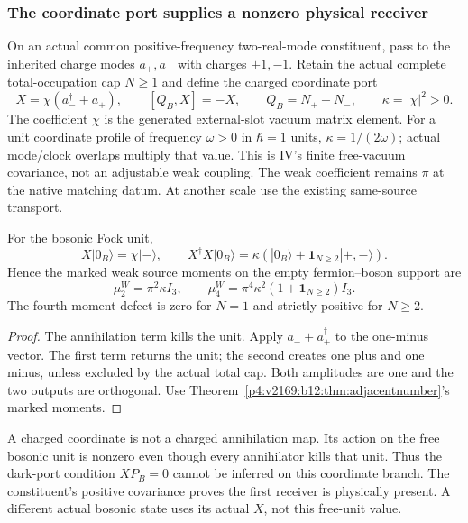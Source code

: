 \documentclass[12pt,a4paper]{article}
\begin{document}
\subsubsection{The coordinate port supplies a nonzero physical receiver}
On an actual common positive-frequency two-real-mode constituent, pass to
the inherited charge modes $a_+,a_-$ with charges $+1,-1$. Retain the actual
complete total-occupation cap $N\ge1$ and define the charged coordinate port
\begin{equation}
 X=\chi(a_-^\dagger+a_+),\qquad
 [Q_B,X]=-X,\qquad Q_B=N_+-N_-,\qquad \kappa=|\chi|^2>0 .
 \label{p5c:eq:v2169-b13-o1}
\end{equation}
The coefficient $\chi$ is the generated external-slot vacuum matrix element.
For a unit coordinate profile of frequency $\omega>0$ in $\hbar=1$ units,
$\kappa=1/(2\omega)$; actual mode/clock overlaps multiply that value.
This is IV's finite free-vacuum covariance, not an adjustable weak coupling.
The weak coefficient remains $\pi$ at the native matching datum.
At another scale use the existing same-source transport.

\begin{theorem}
\label{p5c:v2169:b13:thm:vacuumreturn}
For the bosonic Fock unit,
\begin{equation}
 \boxed{X|0_B\rangle=\chi|-\rangle,\qquad
 X^\dagger X|0_B\rangle
       =\kappa\left(|0_B\rangle+
                    \mathbf1_{N\ge2}|+,-\rangle\right).}
 \label{p5c:eq:v2169-b13-o2}
\end{equation}
Hence the marked weak source moments on the empty fermion--boson support are
\begin{equation}
 \boxed{\mu_2^W=\pi^2\kappa I_3,\qquad
 \mu_4^W=\pi^4\kappa^2(1+\mathbf1_{N\ge2})I_3.} \label{p5c:eq:v2169-b13-o3}
\end{equation}
The fourth-moment defect is zero for $N=1$ and strictly positive for $N\ge2$.
\end{theorem}
\begin{proof}
The annihilation term kills the unit. Apply $a_-+a_+^\dagger$ to the
one-minus vector. The first term returns the unit; the second creates one
plus and one minus, unless excluded by the actual total cap. Both amplitudes
are one and the two outputs are orthogonal. Use Theorem~\ref{p4:v2169:b12:thm:adjacentnumber}'s marked moments.
\end{proof}

A charged coordinate is not a charged annihilation map. Its action on the
free bosonic unit is nonzero even though every annihilator kills that unit.
Thus the dark-port condition $XP_B=0$ cannot be inferred on this coordinate
branch. The constituent's positive covariance proves the first receiver is
physically present. A different actual bosonic state uses its actual $X$,
not this free-unit value.
\end{document}
